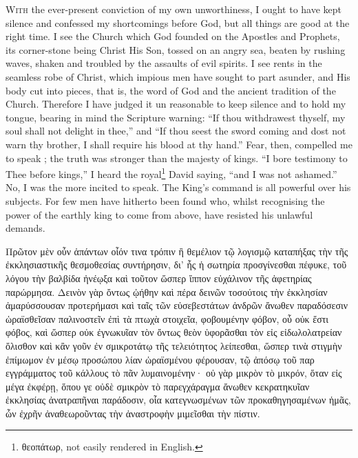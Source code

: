\documentclass[10pt]{book}
\newcommand{\switchGreek}[1][]{\selectlanguage{polutonikogreek} \switchcolumn*[#1]}
\newcommand{\switchEnglish}{\selectlanguage{english} \switchcolumn}
\begin{document}
\begin{paracol}{2}
\switchEnglish

\lettrine{W}{ith} the ever-present conviction of my own
unworthiness, I ought to have kept silence and
confessed my shortcomings before God, but all
things are good at the right time. I see the
Church which God founded on the Apostles
and Prophets, its corner-stone being Christ His
Son, tossed on an angry sea, beaten by rushing
waves, shaken and troubled by the assaults of
evil spirits. I see rents in the seamless robe of
Christ, which impious men have sought to part
asunder, and His body cut into pieces, that is,
the word of God and the ancient tradition of
the Church. Therefore I have judged it un
reasonable to keep silence and to hold my
tongue, bearing in mind the Scripture warning:\textemdash
``If thou withdrawest thyself, my soul 
shall not delight in thee,'' and ``If thou seest 
the sword coming and dost not warn thy 
brother, I shall require his blood at thy hand.'' 
Fear, then, compelled me to speak ; the truth 
was stronger than the majesty of kings.
``I bore testimony to Thee before kings,''
I heard  the royal\footnote{θεοπάτωρ, not easily rendered in English.}
David saying, ``and I was not ashamed.''
No, I was the more incited to 
speak. The King's command is all powerful 
over his subjects. For few men have hitherto 
been found who, whilst recognising the power 
of the earthly king to come from above, have 
resisted his unlawful demands. 

\switchGreek

Πρῶτον μὲν οὖν ἁπάντων οἷόν τινα τρόπιν ἢ θεμέλιον τῷ λογισμῷ καταπήξας τὴν
τῆς ἐκκλησιαστικῆς θεσμοθεσίας συντήρησιν, δι’ ἧς ἡ σωτηρία προσγίνεσθαι
πέφυκε, τοῦ λόγου τὴν βαλβίδα ἠνέῳξα καὶ τοῦτον ὥσπερ ἵππον εὐχάλινον τῆς
ἀφετηρίας παρώρμησα.  Δεινὸν γὰρ ὄντως ᾠήθην καὶ πέρα δεινῶν τοσούτοις τὴν
ἐκκλησίαν ἀμαρύσσουσαν προτερήμασι καὶ ταῖς τῶν εὐσεβεστάτων ἀνδρῶν ἄνωθεν
παραδόσεσιν ὡραϊσθεῖσαν παλινοστεῖν ἐπὶ τὰ πτωχὰ στοιχεῖα, φοβουμένην φόβον,
οὗ οὐκ ἔστι φόβος, καὶ ὥσπερ οὐκ ἐγνωκυῖαν τὸν ὄντως θεὸν ὑφορᾶσθαι τὸν εἰς
εἰδωλολατρείαν ὄλισθον καὶ κἂν γοῦν ἐν σμικροτάτῳ τῆς τελειότητος λείπεσθαι,
ὥσπερ τινὰ στιγμὴν ἐπίμωμον ἐν μέσῳ προσώπου λίαν ὡραϊσμένου φέρουσαν, τῷ
ἀπόσῳ τοῦ παρ εγγράμματος τοῦ κάλλους τὸ πᾶν λυμαινομένην· οὐ γὰρ μικρὸν τὸ
μικρόν, ὅταν εἰς μέγα ἐκφέρῃ, ὅπου γε οὐδὲ σμικρὸν τὸ παρεγχάραγμα ἄνωθεν
κεκρατηκυῖαν ἐκκλησίας ἀνατραπῆναι παράδοσιν, οἷα κατεγνωσμένων τῶν
προκαθηγησαμένων ἡμᾶς, ὧν ἐχρῆν ἀναθεωροῦντας τὴν ἀναστροφὴν μιμεῖσθαι τὴν
πίστιν.

\switchEnglish


\end{paracol}
\end{document}
